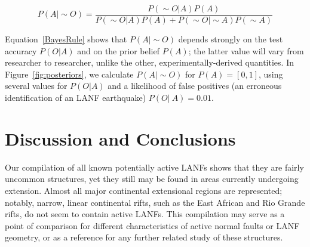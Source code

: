 \documentclass[twocolumn,grl]{AGUTeX}
\begin{document}
\begin{article}
\begin{equation}
P(A | \sim O) = \frac{P(\sim O|A) P(A)}
{P(\sim O|A)P(A) + P(\sim O|\sim A)P(\sim A)}
\label{BayesRule}
\end{equation}

Equation~\ref{BayesRule} shows that $P(A|\sim O)$
depends strongly on the test accuracy $P(O|A)$ and on the
prior belief $P(A)$; the latter value will vary from
researcher to researcher, unlike the other, experimentally-derived quantities.
In Figure~\ref{fig:posteriors}, we calculate $P(A|\sim O)$ for $P(A) = [0,1]$,
using several values for $P(O|A)$ and a likelihood of false positives 
(an erroneous identification of an LANF earthquake) $P(O|~A)= 0.01$. 


\section{Discussion and Conclusions}

Our compilation of all known potentially active LANFs shows that they 
are fairly uncommon structures, yet they still may be found in areas 
currently undergoing extension. Almost all major continental extensional 
regions are represented; notably, narrow, linear continental rifts, such as 
the East African and Rio Grande rifts, do not seem to contain active LANFs.
This compilation may serve as a point of comparison for different
characteristics of active normal faults or LANF geometry, or as a
reference for any further related study of these structures.





\end{article}
\end{document}
